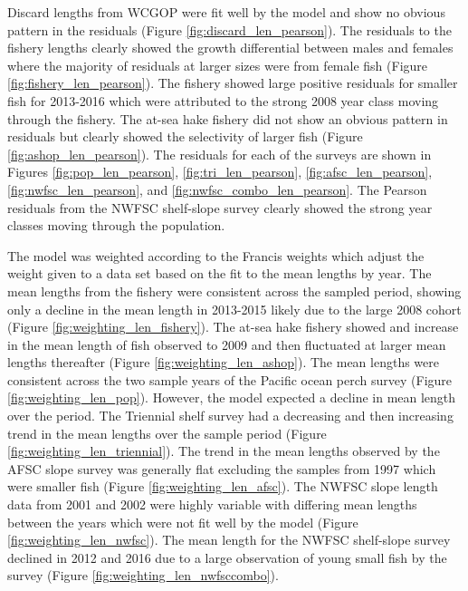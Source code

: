 \documentclass[12pt,]{article}
\begin{document}
Discard lengths from WCGOP were fit well by the model and show no
obvious pattern in the residuals (Figure \ref{fig:discard_len_pearson}).
The residuals to the fishery lengths clearly showed the growth
differential between males and females where the majority of residuals
at larger sizes were from female fish (Figure
\ref{fig:fishery_len_pearson}). The fishery showed large positive
residuals for smaller fish for 2013-2016 which were attributed to the
strong 2008 year class moving through the fishery. The at-sea hake
fishery did not show an obvious pattern in residuals but clearly showed
the selectivity of larger fish (Figure \ref{fig:ashop_len_pearson}). The
residuals for each of the surveys are shown in Figures
\ref{fig:pop_len_pearson}, \ref{fig:tri_len_pearson},
\ref{fig:afsc_len_pearson}, \ref{fig:nwfsc_len_pearson}, and
\ref{fig:nwfsc_combo_len_pearson}. The Pearson residuals from the NWFSC
shelf-slope survey clearly showed the strong year classes moving through
the population.

The model was weighted according to the Francis weights which adjust the
weight given to a data set based on the fit to the mean lengths by year.
The mean lengths from the fishery were consistent across the sampled
period, showing only a decline in the mean length in 2013-2015 likely
due to the large 2008 cohort (Figure \ref{fig:weighting_len_fishery}).
The at-sea hake fishery showed and increase in the mean length of fish
observed to 2009 and then fluctuated at larger mean lengths thereafter
(Figure \ref{fig:weighting_len_ashop}). The mean lengths were consistent
across the two sample years of the Pacific ocean perch survey (Figure
\ref{fig:weighting_len_pop}). However, the model expected a decline in
mean length over the period. The Triennial shelf survey had a decreasing
and then increasing trend in the mean lengths over the sample period
(Figure \ref{fig:weighting_len_triennial}). The trend in the mean
lengths observed by the AFSC slope survey was generally flat excluding
the samples from 1997 which were smaller fish (Figure
\ref{fig:weighting_len_afsc}). The NWFSC slope length data from 2001 and
2002 were highly variable with differing mean lengths between the years
which were not fit well by the model (Figure
\ref{fig:weighting_len_nwfsc}). The mean length for the NWFSC
shelf-slope survey declined in 2012 and 2016 due to a large observation
of young small fish by the survey (Figure
\ref{fig:weighting_len_nwfsccombo}).
\end{document}
